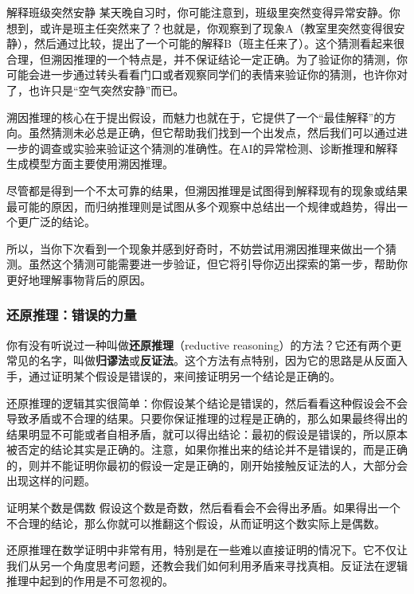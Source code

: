 \begin{example}{解释班级突然安静}
某天晚自习时，你可能注意到，班级里突然变得异常安静。你想到，或许是班主任突然来了？也就是，你观察到了现象A（教室里突然变得很安静），然后通过比较，提出了一个可能的解释B（班主任来了）。这个猜测看起来很合理，但溯因推理的一个特点是，并不保证结论一定正确。为了验证你的猜测，你可能会进一步通过转头看看门口或者观察同学们的表情来验证你的猜测，也许你对了，也许只是“空气突然安静”而已。
\end{example}

溯因推理的核心在于提出假设，而魅力也就在于，它提供了一个“最佳解释”的方向。虽然猜测未必总是正确，但它帮助我们找到一个出发点，然后我们可以通过进一步的调查或实验来验证这个猜测的准确性。在AI的异常检测、诊断推理和解释生成模型方面主要使用溯因推理。

尽管都是得到一个不太可靠的结果，但溯因推理是试图得到解释现有的现象或结果最可能的原因，而归纳推理则是试图从多个观察中总结出一个规律或趋势，得出一个更广泛的结论。

所以，当你下次看到一个现象并感到好奇时，不妨尝试用溯因推理来做出一个猜测。虽然这个猜测可能需要进一步验证，但它将引导你迈出探索的第一步，帮助你更好地理解事物背后的原因。

\subsubsection{还原推理：错误的力量}

你有没有听说过一种叫做\textbf{还原推理}（reductive reasoning）的方法？它还有两个更常见的名字，叫做\textbf{归谬法}或\textbf{反证法}。这个方法有点特别，因为它的思路是从反面入手，通过证明某个假设是错误的，来间接证明另一个结论是正确的。

还原推理的逻辑其实很简单：你假设某个结论是错误的，然后看看这种假设会不会导致矛盾或不合理的结果。只要你保证推理的过程是正确的，那么如果最终得出的结果明显不可能或者自相矛盾，就可以得出结论：最初的假设是错误的，所以原本被否定的结论其实是正确的。注意，如果你推出来的结论并不是错误的，而是正确的，则并不能证明你最初的假设一定是正确的，刚开始接触反证法的人，大部分会出现这样的问题。

\begin{example}{证明某个数是偶数}
假设这个数是奇数，然后看看会不会得出矛盾。如果得出一个不合理的结论，那么你就可以推翻这个假设，从而证明这个数实际上是偶数。
\end{example}

还原推理在数学证明中非常有用，特别是在一些难以直接证明的情况下。它不仅让我们从另一个角度思考问题，还教会我们如何利用矛盾来寻找真相。反证法在逻辑推理中起到的作用是不可忽视的。

